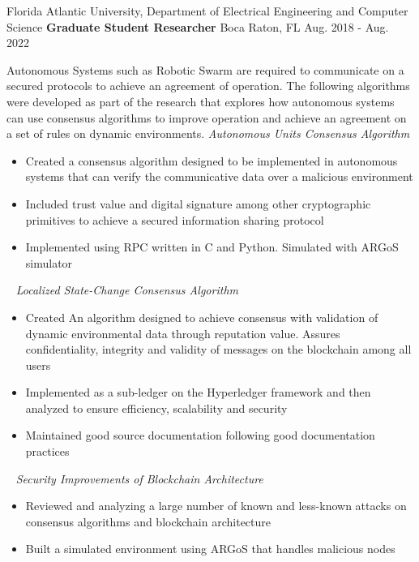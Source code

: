 


\begin{cventries}


\cventry
{Florida Atlantic University, Department of Electrical Engineering and Computer Science} %
{\textbf{Graduate Student Researcher}} %
{Boca Raton, FL} %
{Aug. 2018 - Aug. 2022} %
{Autonomous Systems such as Robotic Swarm are required to communicate on a secured protocols to achieve an agreement of operation. The following algorithms were developed as part of the research that explores how autonomous systems can use consensus algorithms to improve operation and achieve an agreement on a set of rules on dynamic environments.
\newline[0.5\baselineskip]
\textit{Autonomous Units Consensus Algorithm}
\begin{itemize}
	\item {Created a consensus algorithm designed to be implemented in autonomous systems that can verify the communicative data over a malicious environment}
	\item {Included trust value and digital signature among other cryptographic primitives to achieve a secured information sharing protocol}
	\item {Implemented using RPC written in C and Python. Simulated with ARGoS simulator}
\end{itemize}~\newline
\textit{Localized State-Change Consensus Algorithm}
\begin{itemize}
	\item {Created An algorithm designed to achieve consensus with validation of dynamic environmental data through reputation value. Assures confidentiality, integrity and validity of messages on the blockchain among all users}
	\item{Implemented as a sub-ledger on the Hyperledger framework and then analyzed to ensure efficiency, scalability and security}
	\item {Maintained good source documentation following good documentation practices}
\end{itemize}~\newline
\textit{Security Improvements of Blockchain Architecture}
\begin{itemize}
	\item {Reviewed and analyzing a large number of known and less-known attacks on consensus algorithms and blockchain architecture}
	\item {Built a simulated environment using ARGoS that handles malicious nodes}
\end{itemize}
}



\end{cventries}
